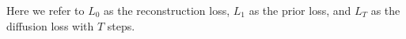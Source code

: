 Here we refer to $L_0$ as the reconstruction loss, $L_1$ as the prior loss, and $L_T$ as the diffusion loss with $T$ steps.  

